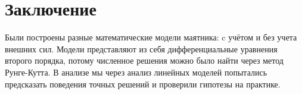 \pagebreak

\section{Заключение}
	Были построены разные математические модели маятника: c учётом и без учета внешних сил. Модели представляют из себя дифференциальные уравнения второго порядка, потому численное решения можно было найти через метод Рунге-Кутта. В анализе мы через анализ линейных моделей попытались предсказать поведения точных решений и проверили гипотезы на практике.

\pagebreak